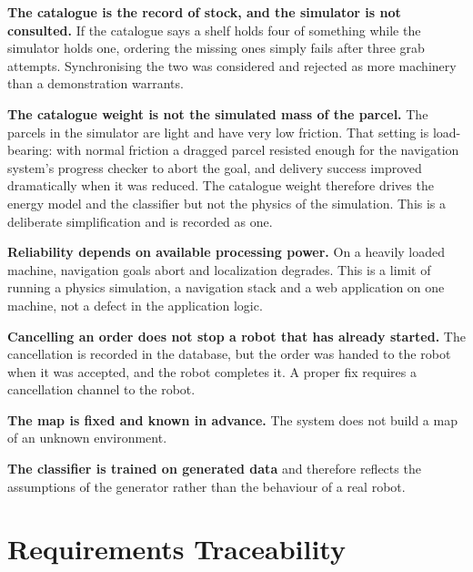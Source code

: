 \documentclass[12pt,a4paper]{report}
\begin{document}
\textbf{The catalogue is the record of stock, and the simulator is not consulted.} If the catalogue
says a shelf holds four of something while the simulator holds one, ordering the missing ones simply
fails after three grab attempts. Synchronising the two was considered and rejected as more machinery
than a demonstration warrants.

\textbf{The catalogue weight is not the simulated mass of the parcel.} The parcels in the simulator
are light and have very low friction. That setting is load-bearing: with normal friction a dragged
parcel resisted enough for the navigation system's progress checker to abort the goal, and delivery
success improved dramatically when it was reduced. The catalogue weight therefore drives the energy
model and the classifier but not the physics of the simulation. This is a deliberate simplification
and is recorded as one.

\textbf{Reliability depends on available processing power.} On a heavily loaded machine, navigation
goals abort and localization degrades. This is a limit of running a physics simulation, a navigation
stack and a web application on one machine, not a defect in the application logic.

\textbf{Cancelling an order does not stop a robot that has already started.} The cancellation is
recorded in the database, but the order was handed to the robot when it was accepted, and the robot
completes it. A proper fix requires a cancellation channel to the robot.

\textbf{The map is fixed and known in advance.} The system does not build a map of an unknown
environment.

\textbf{The classifier is trained on generated data} and therefore reflects the assumptions of the
generator rather than the behaviour of a real robot.

\appendix

\chapter{Requirements Traceability}
\label{app:traceability}
\end{document}
